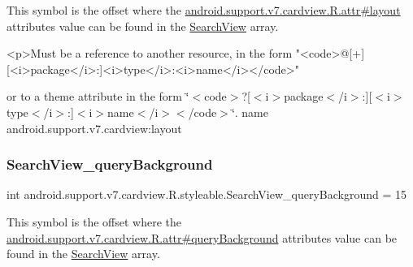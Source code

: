 This symbol is the offset where the \hyperlink{classandroid_1_1support_1_1v7_1_1cardview_1_1R_1_1attr_a09b0bc987f2c5c9dac332b3eea8b0493}{android.\+support.\+v7.\+cardview.\+R.\+attr\#layout} attribute\textquotesingle{}s value can be found in the \hyperlink{classandroid_1_1support_1_1v7_1_1cardview_1_1R_1_1styleable_a6a300ecad88f70a7642265f73ff4d33f}{Search\+View} array.

\begin{DoxyVerb}      <p>Must be a reference to another resource, in the form "<code>@[+][<i>package</i>:]<i>type</i>:<i>name</i></code>"
\end{DoxyVerb}
 or to a theme attribute in the form \char`\"{}$<$code$>$?\mbox{[}$<$i$>$package$<$/i$>$\+:\mbox{]}\mbox{[}$<$i$>$type$<$/i$>$\+:\mbox{]}$<$i$>$name$<$/i$>$$<$/code$>$\char`\"{}.  name android.\+support.\+v7.\+cardview\+:layout \mbox{\label{classandroid_1_1support_1_1v7_1_1cardview_1_1R_1_1styleable_ae43f966eb36b57de8bdb6ddadf0097ad}} 
\subsubsection{\texorpdfstring{Search\+View\+\_\+query\+Background}{SearchView\_queryBackground}}
{\footnotesize\ttfamily int android.\+support.\+v7.\+cardview.\+R.\+styleable.\+Search\+View\+\_\+query\+Background = 15\hspace{0.3cm}{\ttfamily [static]}}

This symbol is the offset where the \hyperlink{classandroid_1_1support_1_1v7_1_1cardview_1_1R_1_1attr_a30fab5bf72caa0de9371b3efcfdd5074}{android.\+support.\+v7.\+cardview.\+R.\+attr\#query\+Background} attribute\textquotesingle{}s value can be found in the \hyperlink{classandroid_1_1support_1_1v7_1_1cardview_1_1R_1_1styleable_a6a300ecad88f70a7642265f73ff4d33f}{Search\+View} array.

